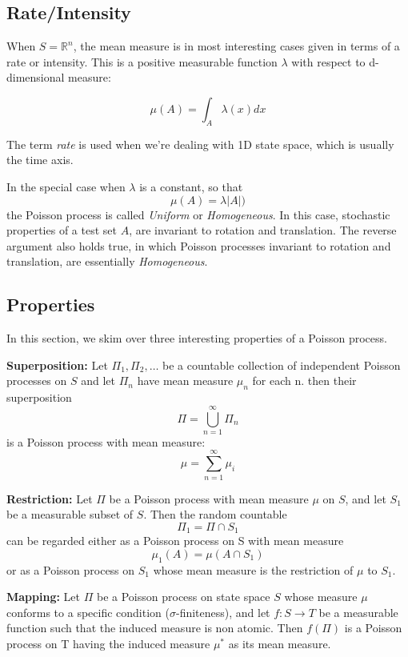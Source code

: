 \documentclass{article}
\begin{document}
\subsection{Rate/Intensity}
When $S = \mathbb{R}^n$, the mean measure is in most interesting cases given in terms of a rate or intensity. This is a positive measurable function $\lambda$ with respect to d-dimensional measure:

\begin{equation}
    \label{ahmad}
    \mu(A) = \int_A \lambda(x)dx
\end{equation}

The term \textit{rate} is used when we're dealing with 1D state space, which is usually the time axis.

In the special case when $\lambda$ is a constant, so that $$ \mu(A) = \lambda|A|)$$ the Poisson process is called \textit{Uniform} or \textit{Homogeneous}. In this case, stochastic properties of a test set $A$, are invariant to rotation and translation. The reverse argument also holds true, in which Poisson processes invariant to rotation and translation, are essentially \textit{Homogeneous}.


\subsection{Properties}
In this section, we skim over three interesting properties of a Poisson process.


\textbf{Superposition:}
    Let $\Pi_1, \Pi_2, \ldots$ be a countable collection of independent Poisson processes on $S$ and let $\Pi_n$ have mean measure $\mu_n$ for each n. then their superposition
    $$ \Pi = \bigcup_{n=1}^\infty \Pi_n$$
    is a Poisson process with mean measure:
    $$ \mu = \sum_{n=1}^\infty \mu_i $$
    
    \smallskip
    
\textbf{Restriction:}
    Let $\Pi$ be a Poisson process with mean measure $\mu$ on $S$, and let $S_1$ be a measurable subset of $S$. Then the random countable 
    $$ \Pi_1 = \Pi \cap S_1$$
    can be regarded either as a Poisson process on S with mean measure
    $$ \mu_1(A) = \mu(A \cap S_1)$$
    or as a Poisson process on $S_1$ whose mean measure is the restriction of $\mu$ to $S_1$.
    
    \smallskip
    
\textbf{Mapping:}
    Let $\Pi$ be a Poisson process on state space $S$ whose measure $\mu$ conforms to a specific condition ($\sigma$-finiteness), and let $f: S \rightarrow T$ be a measurable function such that the induced measure is non atomic. Then $f(\Pi)$ is a Poisson process on T having the induced measure $\mu^*$ as its mean measure.
\end{document}
